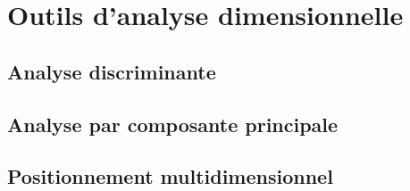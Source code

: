 \chapter{Outils d'analyse dimensionnelle}
\label{app:statmulti}

\section{Analyse discriminante}

\section{Analyse par composante principale}

\section{Positionnement multidimensionnel}
\label{app:mds}
